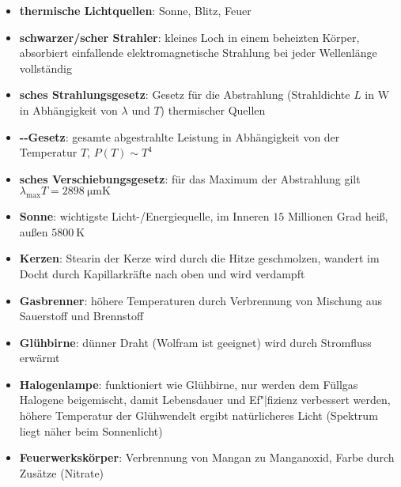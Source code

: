 \begin{itemize}
    \item
    \textbf{thermische Lichtquellen}:
    Sonne, Blitz, Feuer
    
    \item
    \textbf{schwarzer/scher Strahler}:
    kleines Loch in einem beheizten Körper,
    absorbiert einfallende elektromagnetische Strahlung bei jeder Wellenlänge
    vollständig
    
    \item
    \textbf{sches Strahlungsgesetz}:
    Gesetz für die Abstrahlung (Strahldichte $L$ in $\si{\watt}$ in Abhängigkeit
    von $\lambda$ und $T$) thermischer Quellen
    
    \item
    \textbf{--Gesetz}:
    gesamte abgestrahlte Leistung in Abhängigkeit von der Temperatur $T$,
    $P(T) \sim T^4$
    
    \item
    \textbf{sches Verschiebungsgesetz}:
    für das Maximum der Abstrahlung gilt \\
    $\lambda_{\text{max}} T = \SI{2898}{\micro\meter\kelvin}$
    
    \item
    \textbf{Sonne}:
    wichtigste Licht-/Energiequelle,
    im Inneren $15$ Millionen Grad heiß, außen $\SI{5800}{\kelvin}$
    
    \item
    \textbf{Kerzen}:
    Stearin der Kerze wird durch die Hitze geschmolzen, wandert im Docht
    durch Kapillarkräfte nach oben und wird verdampft
    
    \item
    \textbf{Gasbrenner}:
    höhere Temperaturen durch Verbrennung von Mischung aus Sauerstoff und
    Brennstoff
    
    \item
    \textbf{Glühbirne}:
    dünner Draht (Wolfram ist geeignet) wird durch Stromfluss erwärmt
    
    \item
    \textbf{Halogenlampe}:
    funktioniert wie Glühbirne, nur werden dem Füllgas Halogene beigemischt,
    damit Lebensdauer und Ef"|fizienz verbessert werden,
    höhere Temperatur der Glühwendelt ergibt natürlicheres Licht
    (Spektrum liegt näher beim Sonnenlicht)
    
    \item
    \textbf{Feuerwerkskörper}:
    Verbrennung von Mangan zu Manganoxid,
    Farbe durch Zusätze (Nitrate)
\end{itemize}
